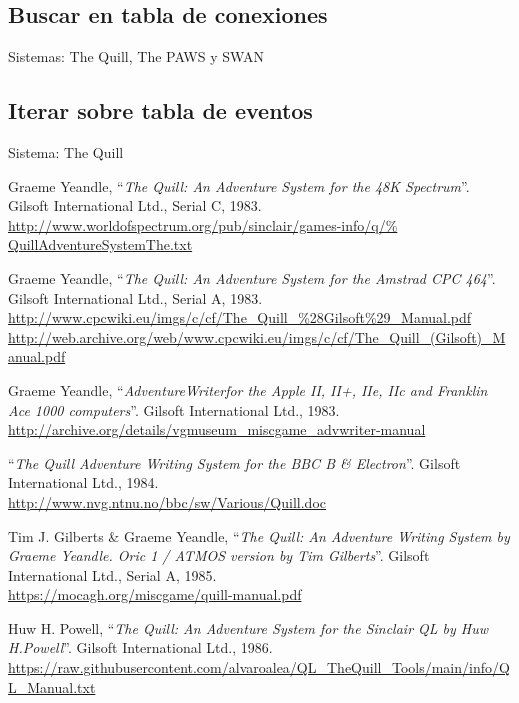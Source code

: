\documentclass[11pt, a5paper]{article}
\newcommand{\quill}{\textsf{The Quill}\xspace}
\newcommand{\paw}{\textsf{The PAWS}\xspace}
\newcommand{\swan}{\textsf{SWAN}\xspace}
\newcommand{\sistema}[1]{\noindent Sistema: #1 \nopagebreak}
\newcommand{\sistemas}[1]{\noindent Sistemas: #1 \nopagebreak}
\begin{document}
\subsection{Buscar en tabla de conexiones}

\sistemas{\quill, \paw y \swan}

\subsection{Iterar sobre tabla de eventos}

\sistema{\quill}


\begin{thebibliography}{99}

  Graeme Yeandle,
  ``\emph{The Quill: An Adventure System for the 48K Spectrum}''.
  Gilsoft International Ltd.,
  Serial C,
  1983.\\
  \url{http://www.worldofspectrum.org/pub/sinclair/games-info/q/%
       QuillAdventureSystemThe.txt}

  Graeme Yeandle,
  ``\emph{The Quill: An Adventure System for the Amstrad CPC 464}''.
  Gilsoft International Ltd.,
  Serial A,
  1983.\\
  \url{http://www.cpcwiki.eu/imgs/c/cf/The_Quill_%28Gilsoft%29_Manual.pdf}\\
  \url{http://web.archive.org/web/www.cpcwiki.eu/imgs/c/cf/The_Quill_(Gilsoft)_Manual.pdf}

  Graeme Yeandle,
  ``\emph{AdventureWriter\texttrademark for the Apple II, II+, IIe, IIc and Franklin Ace 1000 computers}''.
  Gilsoft International Ltd.,
  1983.\\
  \url{http://archive.org/details/vgmuseum_miscgame_advwriter-manual}

  ``\emph{The Quill Adventure Writing System for the BBC B \& Electron}''.
  Gilsoft International Ltd.,
  1984.\\
  \url{http://www.nvg.ntnu.no/bbc/sw/Various/Quill.doc}

  Tim J. Gilberts \& Graeme Yeandle,
  ``\emph{The Quill: An Adventure Writing System by Graeme Yeandle. Oric 1 /
  ATMOS version by Tim Gilberts}''.
  Gilsoft International Ltd.,
  Serial A,
  1985.\\
  \url{https://mocagh.org/miscgame/quill-manual.pdf}

  Huw H. Powell,
  ``\emph{The Quill: An Adventure System for the Sinclair QL by Huw H.Powell}''.
  Gilsoft International Ltd.,
  1986.\\
  \url{https://raw.githubusercontent.com/alvaroalea/QL_TheQuill_Tools/main/info/QL_Manual.txt}


\end{thebibliography}
\end{document}

